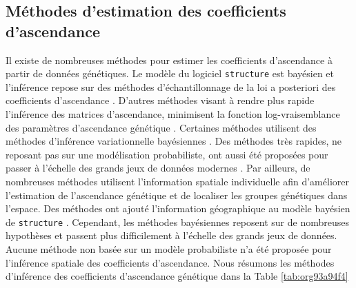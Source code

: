\documentclass[12pt,a4paper,twoside]{ugathesis}
\begin{document}
\subsection{Méthodes d'estimation des coefficients d'ascendance}
\label{sec:org2d9371d}

Il existe de nombreuses méthodes pour estimer les coefficients d'ascendance à
partir de données génétiques. Le modèle du logiciel \texttt{structure} est bayésien et
l'inférence repose sur des méthodes d'échantillonnage de la loi a posteriori des
coefficients d'ascendance \citep{Pritchard2000}. D'autres méthodes visant à rendre
plus rapide l'inférence des matrices d'ascendance, minimisent la fonction
log-vraisemblance des paramètres d'ascendance génétique
\citep{Tang_2005,alexander2009admixture}. Certaines méthodes utilisent des
méthodes d'inférence variationnelle bayésiennes \citep{Raj_2014}. Des méthodes
très rapides, ne reposant pas sur une modélisation probabiliste, ont aussi été
proposées pour passer à l'échelle des grands jeux de données modernes
\citep{Frichot_2014,Popescu_2014}. Par ailleurs, de nombreuses méthodes utilisent
l'information spatiale individuelle afin d'améliorer l'estimation de
l'ascendance génétique et de localiser les groupes génétiques dans l'espace.
Des méthodes ont ajouté l'information géographique au modèle bayésien de
\texttt{structure} \citep{CHEN_2007,Corander2008,GUEDJ_2011}. Cependant, les méthodes
bayésiennes reposent sur de nombreuses hypothèses et passent plus difficilement
à l'échelle des grands jeux de données. Aucune méthode non basée sur un modèle
probabiliste n'a été proposée pour l'inférence spatiale des coefficients
d'ascendance. Nous résumons les méthodes d'inférence des coefficients
d'ascendance génétique dans la Table \ref{tab:org93a94f4}
\end{document}
